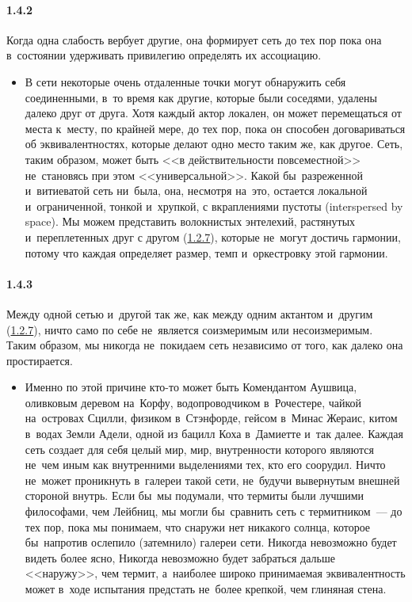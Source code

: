 \paragraph{1.4.2}\hypertarget{par:1.4.2}{} Когда одна слабость вербует другие, она формирует сеть до тех пор пока она в~состоянии удерживать привилегию определять их ассоциацию. 
	\begin{itemize}
	\item В сети некоторые очень отдаленные точки могут обнаружить себя соединенными, в~то время как другие, которые были соседями, удалены далеко друг от друга. Хотя каждый актор локален, он может перемещаться от места к~месту, по крайней мере, до тех пор, пока он способен договариваться об эквивалентностях, которые делают одно место таким же, как другое. Сеть, таким образом, может быть <<в действительности повсеместной>> не~становясь при этом <<универсальной>>. Какой бы~разреженной и~витиеватой сеть ни~была, она, несмотря на~это, остается локальной и~ограниченной, тонкой и~хрупкой, с вкраплениями пустоты (interspersed by space). Мы можем представить волокнистых энтелехий, растянутых и~переплетенных друг с другом (\hyperlink{par:1.2.7}{1.2.7}), которые не~могут достичь гармонии, потому что каждая определяет размер, темп и~оркестровку этой гармонии.
	\end{itemize}

\paragraph{1.4.3}\hypertarget{par:1.4.3}{} Между одной сетью и~другой так же, как между одним актантом и~другим (\hyperlink{par:1.2.7}{1.2.7}), ничто само по себе не~является соизмеримым или несоизмеримым. Таким образом, мы никогда не~покидаем сеть независимо от того, как далеко она простирается.
	\begin{itemize}
	\item Именно по этой причине кто-то может быть Комендантом Аушвица, оливковым деревом на~Корфу, водопроводчиком в~Рочестере, чайкой на~островах Сцилли, физиком в~Стэнфорде, гейсом в~Минас Жераис, китом в~водах Земли Адели, одной из бацилл Коха в~Дамиетте и~так далее. Каждая сеть создает для себя целый мир, мир, внутренности которого являются не~чем иным как внутренними выделениями тех, кто его соорудил. Ничто не~может проникнуть в~галереи такой сети, не~будучи вывернутым внешней стороной внутрь. Если бы~мы подумали, что термиты были лучшими философами, чем Лейбниц, мы могли бы~сравнить сеть с термитником~--- до тех пор, пока мы понимаем, что снаружи нет никакого солнца, которое бы~напротив ослепило (затемнило) галереи сети. Никогда невозможно будет видеть более ясно, Никогда невозможно будет забраться дальше <<наружу>>, чем термит, а~наиболее широко принимаемая эквивалентность может в~ходе испытания предстать не~более крепкой, чем глиняная стена.
	\end{itemize}

